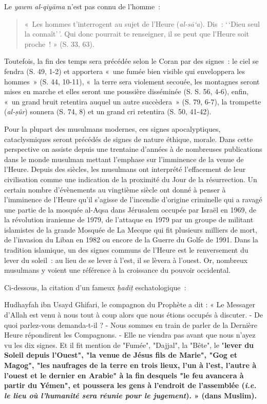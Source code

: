 Le \emph{yawm al-qiyāma} n'est pas connu de l'homme~: 
\begin{quote}
    «~Les hommes
t'interrogent au sujet de l'Heure (\emph{al-sā`a}). Dis~: `\,`Dieu seul
la connaît'\,'. Qui donc pourrait te renseigner, il se peut que l'Heure
soit proche~! » (S. 33, 63). 
\end{quote}
Toutefois, la fin des temps sera précédée
selon le Coran par des signes~: le ciel se fendra (S. 49, 1-2) et
apportera «~une fumée bien visible qui enveloppera les hommes~» (S. 44,
10-11), «~la terre sera violement secouée, les montagnes seront mises en
marche et elles seront une poussière disséminée (S. S. 56, 4-6), enfin,
«~un grand bruit retentira auquel un autre succèdera~» (S. 79, 6-7), la
trompette (\emph{al-ṣûr}) sonnera (S. 74, 8) et un grand cri retentira
(S. 50, 41-42).

Pour la plupart des musulmans modernes, ces signes apocalyptiques,
cataclysmiques seront précédés de signes de nature éthique, morale. Dans
cette perspective on assiste depuis une trentaine d'années à de
nombreuses publications dans le monde musulman mettant l'emphase sur
l'imminence de la venue de l'Heure. Depuis des siècles, les musulmans
ont interprété l'effacement de leur civilisation comme une indication de
la proximité du Jour de la résurrection. Un certain nombre d'évènements
au vingtième siècle ont donné à penser à l'imminence de l'Heure qu'il
s'agisse de l'incendie d'origine criminelle qui a ravagé une partie de
la mosquée al-Aqsa dans Jérusalem occupée par Israël en 1969, de la révolution
iranienne de 1979, de l'attaque en 1979 par un groupe de militant
islamistes de la grande Mosquée de La Mecque qui fit plusieurs milliers
de mort,
de l'invasion du Liban en 1982 ou encore de la Guerre du Golfe de
1991.
Dans la tradition islamique, un des signes communs de l'Heure est le
renversement du lever du soleil~: au lieu de se lever à l'est, il se
lèvera à l'ouest. Or, nombreux musulmans y voient une référence à la
croissance du pouvoir occidental.

Ci-dessous, la citation d'un fameux \emph{ḥadīṯ} eschatologique~:

 Hudhayfah ibn Usayd Ghifari, le compagnon du Prophète
a dit : « Le Messager d'Allah est venu à nous tout à coup
alors que nous étions occupés à discuter. - De quoi
parlez-vous demanda-t-il ? - Nous sommes en train de parler
de la Dernière Heure répondirent les Compagnons. - Elle ne
viendra pas avant que nous n'ayez vu les dix signes. Et il
fit mention de "Fumée", "Dajjal", la "Bête", le "\textbf{lever du Soleil
depuis l'Ouest", "la venue de Jésus fils de Marie", "Gog et Magog",
"les naufrages de la terre en trois lieux, l'un à l'est, l'autre à
l'ouest et le dernier en Arabie" à la fin desquels "le feu avancera à
partir du Yémen", et poussera les gens à l'endroit de l'assemblée
(\emph{i.e. le lieu où l'humanité sera réunie pour le jugement}). »
(dans Muslim).}

